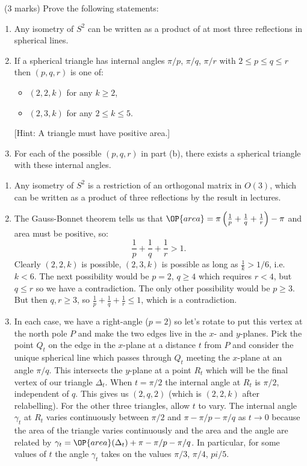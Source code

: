 \documentclass[12pt]{article}
\begin{document}
\begin{question}\ (3 marks)
  Prove the following statements:
  \begin{enumerate}
  \item[(a)] Any isometry of $S^2$ can be written as a product of at most three reflections in spherical lines.
  \item[(b)] If a spherical triangle has internal angles $\pi/p$, $\pi/q$, $\pi/r$ with $2\leq p\leq q\leq r$ then $(p,q,r)$ is one of:
    \begin{itemize}
    \item $(2,2,k)$ for any $k\geq 2$,
    \item $(2,3,k)$ for any $2\leq k\leq 5$.
    \end{itemize}
    [Hint: A triangle must have positive area.]
  \item[(c)] For each of the possible $(p,q,r)$ in part (b), there exists a spherical triangle with these internal angles.
  \end{enumerate}
\end{question}

\begin{answer}
  \begin{enumerate}
  \item[(a)] Any isometry of $S^2$ is a restriction of an orthogonal matrix in $O(3)$, which can be written as a product of three reflections by the result in lectures.
  \item[(b)] The Gauss-Bonnet theorem tells us that $\OP{area}=\pi\left(\frac{1}{p}+\frac{1}{q}+\frac{1}{r}\right)-\pi$ and area must be positive, so:
    \[\frac{1}{p}+\frac{1}{q}+\frac{1}{r}>1.\]
    Clearly $(2,2,k)$ is possible, $(2,3,k)$ is possible as long as $\frac{1}{k}>1/6$, i.e. $k<6$. The next possibility would be $p=2$, $q\geq 4$ which requires $r<4$, but $q\leq r$ so we have a contradiction. The only other possibility would be $p\geq 3$. But then $q,r\geq 3$, so $\frac{1}{p}+\frac{1}{q}+\frac{1}{r}\leq 1$, which is a contradiction.
  \item[(c)] In each case, we have a right-angle ($p=2$) so let's rotate to put this vertex at the north pole $P$ and make the two edges live in the $x$- and $y$-planes. Pick the point $Q_t$ on the edge in the $x$-plane at a distance $t$ from $P$ and consider the unique spherical line which passes through $Q_t$ meeting the $x$-plane at an angle $\pi/q$. This intersects the $y$-plane at a point $R_t$ which will be the final vertex of our triangle $\Delta_t$. When $t=\pi/2$ the internal angle at $R_t$ is $\pi/2$, independent of $q$. This gives us $(2,q,2)$ (which is $(2,2,k)$ after relabelling). For the other three triangles, allow $t$ to vary. The internal angle $\gamma_t$ at $R_t$ varies continuously between $\pi/2$ and $\pi-\pi/p-\pi/q$ as $t\to 0$ because the area of the triangle varies continuously and the area and the angle are related by $\gamma_t=\OP{area}(\Delta_t)+\pi-\pi/p-\pi/q$. In particular, for some values of $t$ the angle $\gamma_t$ takes on the values $\pi/3$, $\pi/4$, $pi/5$.
  \end{enumerate}
\end{answer}
\newpage
\end{document}
